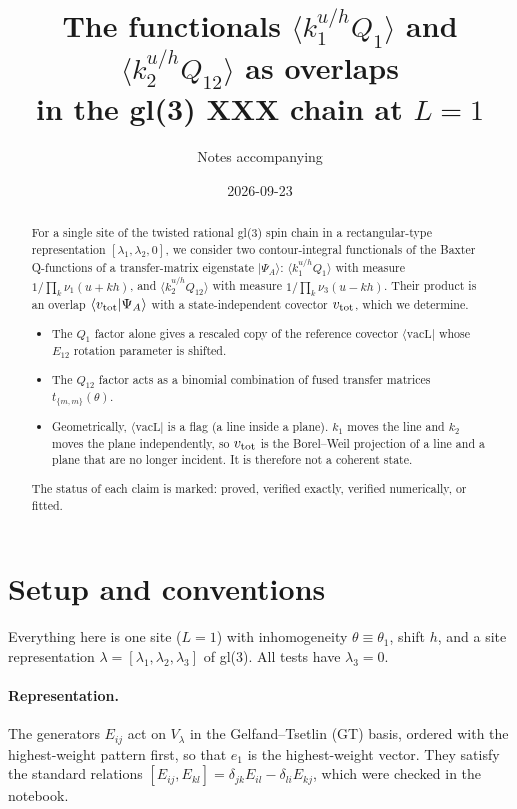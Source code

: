 \documentclass[11pt]{article}
\title{The functionals $\langle k_1^{u/h}Q_1\rangle$ and $\langle k_2^{u/h}Q_{12}\rangle$ as overlaps\\
in the gl(3) XXX chain at $L=1$}
\author{Notes accompanying \nb{L1-mathcalA.wb}}
\date{2026-09-23}
\newcommand{\vacL}{\langle\mathrm{vacL}|}
\theoremstyle{definition}
\theoremstyle{remark}
\begin{document}
\maketitle

\begin{abstract}
For a single site of the twisted rational gl(3) spin chain in a rectangular-type representation $[\lambda_1,\lambda_2,0]$, we consider two contour-integral functionals of the Baxter Q-functions of a transfer-matrix eigenstate $|\Psi_A\rangle$: $\langle k_1^{u/h}Q_1\rangle$ with measure $1/\prod_k\nu_1(u+kh)$, and $\langle k_2^{u/h}Q_{12}\rangle$ with measure $1/\prod_k\nu_3(u-kh)$. Their product is an overlap $\langle v_{\rm tot}|\Psi_A\rangle$ with a state-independent covector $v_{\rm tot}$, which we determine.

\begin{itemize}
\item The $Q_1$ factor alone gives a rescaled copy of the reference covector $\vacL$ whose $E_{12}$ rotation parameter is shifted.
\item The $Q_{12}$ factor acts as a binomial combination of fused transfer matrices $t_{\{m,m\}}(\theta)$.
\item Geometrically, $\vacL$ is a flag (a line inside a plane). $k_1$ moves the line and $k_2$ moves the plane independently, so $v_{\rm tot}$ is the Borel--Weil projection of a line and a plane that are no longer incident. It is therefore not a coherent state.
\end{itemize}

The status of each claim is marked: proved, verified exactly, verified numerically, or fitted.
\end{abstract}

\tableofcontents

\section{Setup and conventions}\label{sec:setup}

Everything here is one site ($L=1$) with inhomogeneity $\theta\equiv\theta_1$, shift $h$, and a site representation $\lambda=[\lambda_1,\lambda_2,\lambda_3]$ of gl(3). All tests have $\lambda_3=0$.

\paragraph{Representation.}
The generators $E_{ij}$ act on $V_\lambda$ in the Gelfand--Tsetlin (GT) basis, ordered with the highest-weight pattern first, so that $e_1$ is the highest-weight vector. They satisfy the standard relations $[E_{ij},E_{kl}]=\delta_{jk}E_{il}-\delta_{li}E_{kj}$, which were checked in the notebook.
\end{document}
